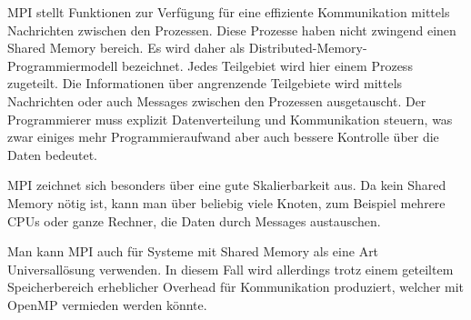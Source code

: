 MPI stellt Funktionen zur Verfügung für eine effiziente Kommunikation mittels Nachrichten zwischen den Prozessen.
Diese Prozesse haben nicht zwingend einen Shared Memory bereich.
Es wird daher als Distributed-Memory-Programmiermodell bezeichnet.
Jedes Teilgebiet wird hier einem Prozess zugeteilt.
Die Informationen über angrenzende Teilgebiete wird mittels Nachrichten oder auch Messages zwischen den Prozessen ausgetauscht.
Der Programmierer muss explizit Datenverteilung und Kommunikation steuern, was zwar einiges mehr Programmieraufwand aber auch bessere Kontrolle über die Daten bedeutet.

MPI zeichnet sich besonders über eine gute Skalierbarkeit aus.
Da kein Shared Memory nötig ist, kann man über beliebig viele Knoten, zum Beispiel mehrere CPUs oder ganze Rechner, die Daten durch Messages austauschen.

Man kann MPI auch für Systeme mit Shared Memory als eine Art Universallösung verwenden.
In diesem Fall wird allerdings trotz einem geteiltem Speicherbereich erheblicher Overhead für Kommunikation produziert, welcher mit OpenMP vermieden werden könnte.